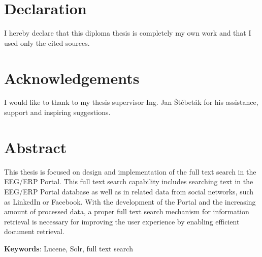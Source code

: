 \documentclass[12pt, oneside, a4paper]{book}
\begin{document}
\pagestyle{empty}


\chapter*{Declaration}

I hereby declare that this diploma thesis is completely my own work
and that I used only the cited sources. 

\theauthor
\thedate

\pagebreak{}



\chapter*{Acknowledgements}

I would like to thank to my thesis supervisor Ing. Jan Štěbeták for his assistance, support and inspiring suggestions.

\pagebreak{}




\chapter*{Abstract}


This thesis is focused on design and implementation of the full text search in the EEG/ERP Portal. 
This full text search capability includes searching text in the EEG/ERP Portal database as well as in related data from social networks, such as LinkedIn or Facebook. 
With the development of the Portal and the increasing amount of processed data, a proper full text search mechanism for information retrieval is necessary for improving the user experience by enabling efficient do\-cu\-ment retrieval. 

\pagebreak{}

{\bf Keywords}:
Lucene, Solr, full text search
	

\vfill\eject

\pagestyle{plain} 

\tableofcontents

\mainmatter
\end{document}

